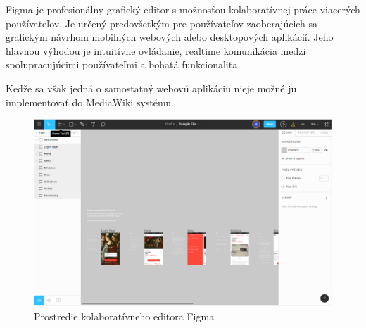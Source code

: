 Figma je profesionálny grafický editor s možnosťou kolaboratívnej práce viacerých používateľov. Je určený predovšetkým pre používateľov zaoberajúcich sa grafickým návrhom mobilných webových alebo desktopových aplikácií. Jeho hlavnou výhodou je intuitívne ovládanie, realtime komunikácia medzi spolupracujúcimi používateľmi a bohatá funkcionalita. 

Keďže sa však jedná o samostatný webovú aplikáciu nieje možné ju implementovať do MediaWiki systému.

\begin{figure}[h]
	\centerline{\includegraphics[width=1\textwidth]{images/figma}}
	\caption[Editor Figma]{Prostredie kolaboratívneho editora Figma}
	\label{obr:Figma}
\end{figure}
\FloatBarrier
